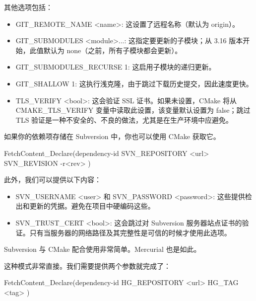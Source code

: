其他选项包括：

\begin{itemize}
\item
GIT\_REMOTE\_NAME <name>: 这设置了远程名称（默认为 origin）。

\item
GIT\_SUBMODULES <module>...: 这指定要更新的子模块；从 3.16 版本开始，此值默认为 none（之前，所有子模块都会更新）。

\item
GIT\_SUBMODULES\_RECURSE 1: 这启用子模块的递归更新。

\item
GIT\_SHALLOW 1: 这执行浅克隆，由于跳过下载历史提交，因此速度更快。

\item
TLS\_VERIFY <bool>: 这会验证 SSL 证书。如果未设置，CMake 将从 CMAKE\_TLS\_VERIFY 变量中读取此设置，该变量默认设置为 false；跳过 TLS 验证是一种不安全的、不良的做法，尤其是在生产环境中应避免。
\end{itemize}

如果你的依赖项存储在 Subversion 中，你也可以使用 CMake 获取它。


\begin{shell}
FetchContent_Declare(dependency-id
                     SVN_REPOSITORY <url>
                     SVN_REVISION -r<rev>
)
\end{shell}

此外，我们可以提供以下内容：

\begin{itemize}
\item
SVN\_USERNAME <user> 和 SVN\_PASSWORD <password>: 这些提供检出和更新的凭据。避免在项目中硬编码这些。

\item
SVN\_TRUST\_CERT <bool>: 这会跳过对 Subversion 服务器站点证书的验证。只有当服务器的网络路径及其完整性是可信的时候才使用此选项。
\end{itemize}

Subversion 与 CMake 配合使用非常简单。Mercurial 也是如此。


这种模式非常直接。我们需要提供两个参数就完成了：

\begin{shell}
FetchContent_Declare(dependency-id
                     HG_REPOSITORY <url>
                     HG_TAG <tag>
)
\end{shell}

